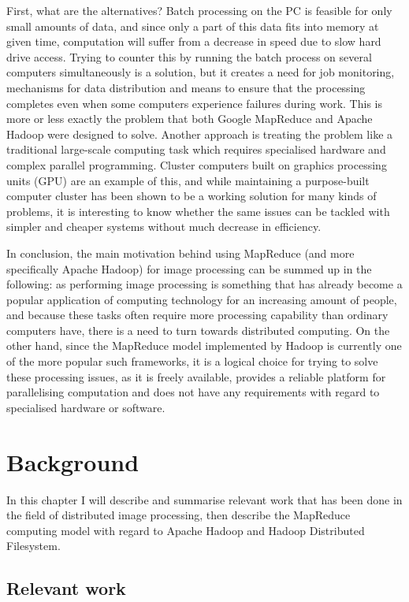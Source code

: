 \documentclass [12pt,a4paper]{report}
\begin{document}
First, what are the alternatives? Batch processing on the PC is feasible for only small amounts of data, and since only a part of this data fits into memory at given time, computation will suffer from a decrease in speed due to slow hard drive access. Trying to counter this by running the batch process on several computers simultaneously is a solution, but it creates a need for job monitoring, mechanisms for data distribution and means to ensure that the processing completes even when some computers experience failures during work. This is more or less exactly the problem that both Google MapReduce and Apache Hadoop were designed to solve. Another approach is treating the problem like a traditional large-scale computing task which requires specialised hardware and complex parallel programming. Cluster computers built on graphics processing units (GPU) are an example of this, and while maintaining a purpose-built computer cluster has been shown to be a working solution for many kinds of problems, it is interesting to know whether the same issues can be tackled with simpler and cheaper systems without much decrease in efficiency.

In conclusion, the main motivation behind using MapReduce (and more specifically Apache Hadoop) for image processing can be summed up in the following: as performing image processing is something that has already become a popular application of computing technology for an increasing amount of people, and because these tasks often require more processing capability than ordinary computers have, there is a need to turn towards distributed computing. On the other hand, since the MapReduce model implemented by Hadoop is currently one of the more popular such frameworks, it is a logical choice for trying to solve these processing issues, as it is freely available, provides a reliable platform for parallelising computation and does not have any requirements with regard to specialised hardware or software.

\chapter{Background}

In this chapter I will describe and summarise relevant work that has been done in the field of distributed image processing, then describe the MapReduce computing model with regard to Apache Hadoop and Hadoop Distributed Filesystem.

\section{Relevant work}
\end{document}

